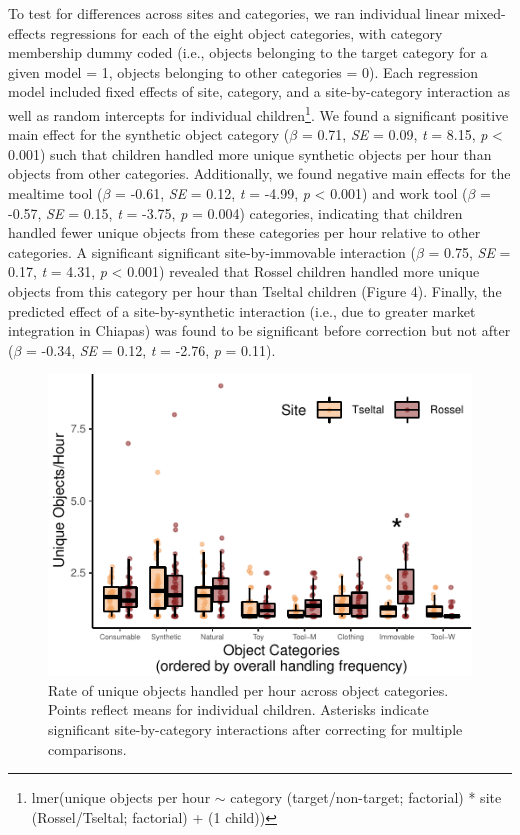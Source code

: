 \documentclass[10pt, letterpaper]{article}
\newenvironment{CodeChunk}{}{}
\begin{document}
To test for differences across sites and categories, we ran individual
linear mixed-effects regressions for each of the eight object
categories, with category membership dummy coded (i.e., objects
belonging to the target category for a given model = 1, objects
belonging to other categories = 0). Each regression model included fixed
effects of site, category, and a site-by-category interaction as well as
random intercepts for individual children\footnote{lmer(unique objects
  per hour \({\sim}\) category (target/non-target; factorial) * site
  (Rossel/Tseltal; factorial) + (1 \textbar{} child))}. We found a
significant positive main effect for the synthetic object category
(\(\beta\) = 0.71, \emph{SE} = 0.09, \emph{t} = 8.15, \emph{p}
\textless{} 0.001) such that children handled more unique synthetic
objects per hour than objects from other categories. Additionally, we
found negative main effects for the mealtime tool (\(\beta\) = -0.61,
\emph{SE} = 0.12, \emph{t} = -4.99, \emph{p} \textless{} 0.001) and work
tool (\(\beta\) = -0.57, \emph{SE} = 0.15, \emph{t} = -3.75, \emph{p} =
0.004) categories, indicating that children handled fewer unique objects
from these categories per hour relative to other categories. A
significant significant site-by-immovable interaction (\(\beta\) = 0.75,
\emph{SE} = 0.17, \emph{t} = 4.31, \emph{p} \textless{} 0.001) revealed
that Rossel children handled more unique objects from this category per
hour than Tseltal children (Figure 4). Finally, the predicted effect of
a site-by-synthetic interaction (i.e., due to greater market integration
in Chiapas) was found to be significant before correction but not after
(\(\beta\) = -0.34, \emph{SE} = 0.12, \emph{t} = -2.76, \emph{p} =
0.11).

\begin{CodeChunk}
\begin{figure}[!h]

\includegraphics{figs/overall-stats-fig-1} \hfill{}

\caption[Rate of unique objects handled per hour across object categories]{Rate of unique objects handled per hour across object categories. Points reflect means for individual children. Asterisks indicate significant site-by-category interactions after correcting for multiple comparisons.}\label{fig:overall-stats-fig}
\end{figure}
\end{CodeChunk}
\end{document}
